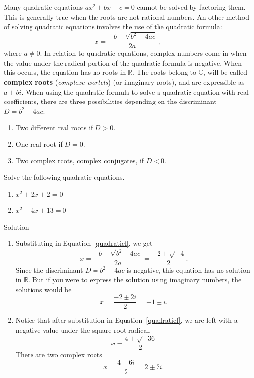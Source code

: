Many quadratic equations $ax^2 + bx + c = 0$ cannot be solved by factoring them. This is generally true when the roots are not rational numbers. An other method of solving quadratic equations involves the use of the quadratic formula: 
\begin{equation}
 x = \dfrac{-b \pm \sqrt{b^2-4ac}}{2a}\,,
 \label{quadraticf}
\end{equation}
 where $a \neq 0$.
In relation to quadratic equations, complex numbers come in when the value under the radical portion of the quadratic formula is negative. When this occurs, the equation has no roots in $\mathbb{R}$. The roots belong to $\mathbb{C}$, will be called \textbf{complex roots} (\textit{complexe wortels}) (or imaginary roots), and are expressible as  $a\pm bi$. When using the quadratic formula to solve a quadratic equation with real coefficients, there are three possibilities depending on the discriminant $D=b^2-4ac$:
\begin{enumerate}
\item Two different real roots if $D>0$.
\item One real root if $D=0$.
\item Two complex roots, complex conjugates, if $D<0$.
\end{enumerate}


\begin{example}
Solve the following quadratic equations.
\begin{multicols}{2}
\begin{enumerate}
\item $x^2+2x+2=0$
\item $x^2-4x+13=0$
\end{enumerate}
\end{multicols}


Solution 


\begin{enumerate}
	\item Substituting in Equation~\eqref{quadraticf}, we get
	\[ x = \dfrac{-b \pm \sqrt{b^2-4ac}}{2a} =  \dfrac{-2 \pm \sqrt{-4}}{2}.   \]
	Since the discriminant $D=b^2-4ac$ is negative, this equation has no solution in $\mathbb{R}$.	But if you were to express the solution using imaginary numbers, the solutions would be 
	\[x = \dfrac{-2 \pm 2i}{2} = -1 \pm i.\]
	
	\item Notice that after substitution in Equation~\eqref{quadraticf}, we are left with a negative value under the square root radical.
	\[x = \dfrac{4 \pm \sqrt{-36}}{2}  \]
	There are two complex roots
	\[x = \dfrac{4 \pm 6i}{2} = 2 \pm 3i.\]
\end{enumerate}


\end{example}


